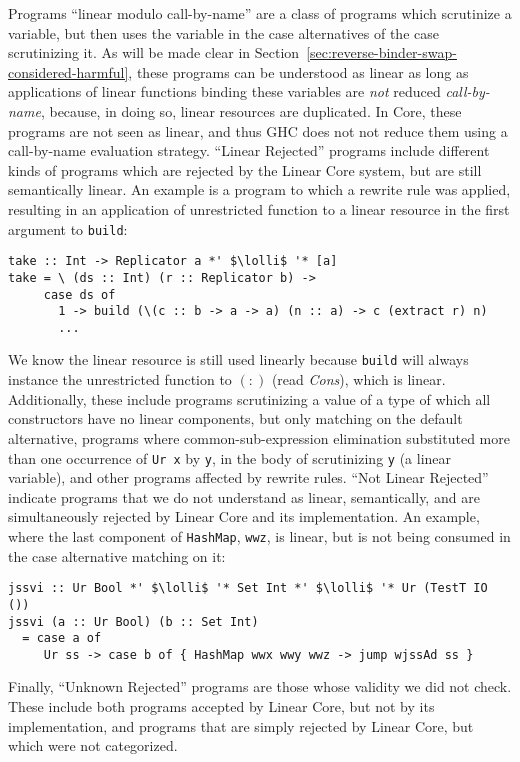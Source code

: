\documentclass[acmsmall,review]{acmart}
\newcommand{\incode}[1]{\lstinline{#1}}
\newcommand{\lolli}{\multimap}
\begin{document}
Programs ``linear modulo call-by-name'' are a class of programs
which scrutinize a variable, but then uses the variable in the case
alternatives of the case scrutinizing it. As will be made clear in
Section~\ref{sec:reverse-binder-swap-considered-harmful}, these programs can be
understood as linear as long as applications of linear functions binding these
variables are \emph{not} reduced \emph{call-by-name}, because, in doing so,
linear resources are duplicated. In Core, these programs are not seen as
linear, and thus GHC does not not reduce them using a call-by-name evaluation strategy.
%
``Linear Rejected'' programs include different kinds of programs which are
rejected by the Linear Core system, but are still semantically linear. An
example is a program to which a rewrite rule was applied, resulting in an
application of unrestricted function to a linear resource in the first argument
to \incode{build}:
\begin{lstlisting}
take :: Int -> Replicator a *' $\lolli$ '* [a]
take = \ (ds :: Int) (r :: Replicator b) ->
     case ds of
       1 -> build (\(c :: b -> a -> a) (n :: a) -> c (extract r) n)
       ...
\end{lstlisting}
We know the linear resource is still used linearly because \incode{build} will
always instance the unrestricted function to $(:)$ (read \emph{Cons}), which is
linear. Additionally, these include programs scrutinizing a value of a type of
which all constructors have no linear components, but only matching on the
default alternative, programs where common-sub-expression elimination
substituted more than one occurrence of \incode{Ur x} by \incode{y}, in the body of
scrutinizing \incode{y} (a linear variable), and other programs affected by rewrite rules.
%
``Not Linear Rejected'' indicate programs that we do not understand as linear,
semantically, and are simultaneously rejected by Linear Core and its
implementation. An example, where the last component of \incode{HashMap}, \incode{wwz},
is linear, but is not being consumed in the case alternative matching on it:
\begin{lstlisting}
jssvi :: Ur Bool *' $\lolli$ '* Set Int *' $\lolli$ '* Ur (TestT IO ())
jssvi (a :: Ur Bool) (b :: Set Int)
  = case a of
     Ur ss -> case b of { HashMap wwx wwy wwz -> jump wjssAd ss }
\end{lstlisting}
%
Finally, ``Unknown Rejected'' programs are those whose validity we did not
check. These include both programs accepted by Linear Core, but not by its
implementation, and programs that are simply rejected by Linear Core, but which
were not categorized.
\end{document}
